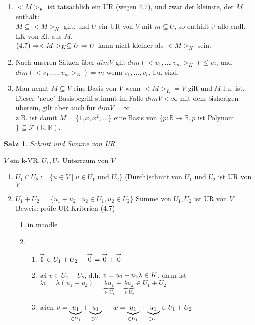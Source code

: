 \documentclass[a4paper,11pt]{article}
\newtheorem{satz}[definition]{Satz}
\begin{document}
\begin{enumerate}[label=\alph*)]
\item $<M>_K$ ist tatsächlich ein UR (wegen 4.7), und zwar der kleinste, der $M$ enthält:\\
$M\subseteq<M>_K$ gilt, und $U$ ein UR von $V$ mit $m\subseteq U$, so enthält $U$ alle endl. LK von El. aus $M$. \\
$(4.7)\Rightarrow<M>_K\subseteq U \\
\Rightarrow U$ kann nicht kleiner als $<M>_K$ sein.
\item Nach unseren Sätzen über $dimV$ gilt $dim(<v_1,...,v_m>_K)\leq m$, und \\
$dim(<v_1,...,v_m>_K)=m$ wenn $v_1,...,v_m$ l.u. sind.
\item Man nennt $M\subseteq V$ eine Basis von $V$ wenn $<M>_K=V$ gilt und $M$ l.u. ist. \\
Dieser "neue" Basisbegriff stimmt im Falle $dimV<\infty$ mit dem bisherigen überein, gilt aber auch für $dimV=\infty$ \\
z.B. ist damit $M=\{1,x,x^2,...\}$ eine Basis von $\{p\colon\mathbb{R}\rightarrow\mathbb{R}, p$ ist Polynom $\}\subseteq\mathscr{F}(\mathbb{R},\mathbb{R})$.
\end{enumerate}
\newpage
\begin{satz}
Schnitt und Summe von UR
\end{satz}
$V$ ein k-VR, $U_1, U_2$ Unterraum von $V$
\begin{enumerate}[label=\alph*)]
\item $U_1\cap U_2:=\{u\in V\mid u\in U_1$ und $U_2\}$ (Durch)schnitt von $U_1$ und $U_2$ ist UR von $V$
\item $U_1+U_2:=\{u_1+u_2\mid u_2\in U_1, u_2\in U_2\}$ Summe von $U_1,U_2$ ist UR von $V$ \\
Beweis: prüfe UR-Kriterien (4.7)
\begin{enumerate}[label=\alph*)]
\item in moodle
\item
\begin{enumerate}[label=(\arabic*)]
\item $\overset{\rightarrow}{0}\in U_1+U_2\hspace{5mm}\overset{\rightarrow}{0}=\overset{\rightarrow}{0}+\overset{\rightarrow}{0}$
\item sei $v\in U_1+U_2$, d.h. $v=u_1+u_2 \\
\lambda\in K$, dann ist $\lambda v=\lambda(u_1+u_2)=\underbrace{\lambda u_1}_{\in U_1}+\underbrace{\lambda u_2}_{\in U_2}\in U_1+U_2$
\item seien $v=\underbrace{u_1}_{\in U_1}+\underbrace{u_1}_{\in U_1}\hspace{5mm}w=\underbrace{u_1}_{\in U_1}+\underbrace{u_1}_{\in U_1}\in U_1+U_2$
\end{enumerate}
\end{enumerate}
\end{enumerate}
\end{document}
